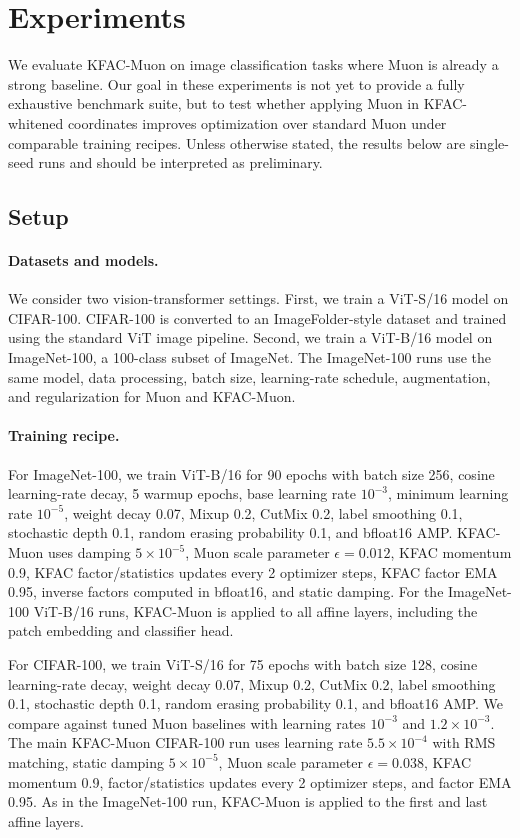 \section{Experiments}
\label{sec:experiments}

We evaluate KFAC-Muon on image classification tasks where Muon is already a strong baseline. Our goal in these experiments is not yet to provide a fully exhaustive benchmark suite, but to test whether applying Muon in KFAC-whitened coordinates improves optimization over standard Muon under comparable training recipes. Unless otherwise stated, the results below are single-seed runs and should be interpreted as preliminary.

\subsection{Setup}
\label{sec:experiments-setup}

\paragraph{Datasets and models.}
We consider two vision-transformer settings. First, we train a ViT-S/16 model on CIFAR-100. CIFAR-100 is converted to an ImageFolder-style dataset and trained using the standard ViT image pipeline. Second, we train a ViT-B/16 model on ImageNet-100, a 100-class subset of ImageNet. The ImageNet-100 runs use the same model, data processing, batch size, learning-rate schedule, augmentation, and regularization for Muon and KFAC-Muon.

\paragraph{Training recipe.}
For ImageNet-100, we train ViT-B/16 for 90 epochs with batch size 256, cosine learning-rate decay, 5 warmup epochs, base learning rate $10^{-3}$, minimum learning rate $10^{-5}$, weight decay 0.07, Mixup 0.2, CutMix 0.2, label smoothing 0.1, stochastic depth 0.1, random erasing probability 0.1, and bfloat16 AMP. KFAC-Muon uses damping $5 \times 10^{-5}$, Muon scale parameter $\epsilon=0.012$, KFAC momentum 0.9, KFAC factor/statistics updates every 2 optimizer steps, KFAC factor EMA 0.95, inverse factors computed in bfloat16, and static damping. For the ImageNet-100 ViT-B/16 runs, KFAC-Muon is applied to all affine layers, including the patch embedding and classifier head.

For CIFAR-100, we train ViT-S/16 for 75 epochs with batch size 128, cosine learning-rate decay, weight decay 0.07, Mixup 0.2, CutMix 0.2, label smoothing 0.1, stochastic depth 0.1, random erasing probability 0.1, and bfloat16 AMP. We compare against tuned Muon baselines with learning rates $10^{-3}$ and $1.2\times 10^{-3}$. The main KFAC-Muon CIFAR-100 run uses learning rate $5.5\times 10^{-4}$ with RMS matching, static damping $5\times 10^{-5}$, Muon scale parameter $\epsilon=0.038$, KFAC momentum 0.9, factor/statistics updates every 2 optimizer steps, and factor EMA 0.95. As in the ImageNet-100 run, KFAC-Muon is applied to the first and last affine layers.

